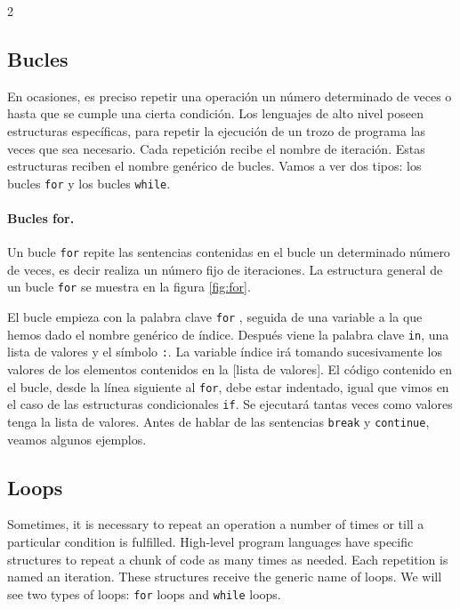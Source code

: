\begin{paracol}{2}
\subsection{Bucles}
En ocasiones, es preciso repetir una operación un número determinado de veces o hasta que se cumple una cierta condición. Los lenguajes de alto nivel poseen estructuras específicas, para repetir la ejecución de un trozo de programa las veces que sea necesario. Cada repetición recibe el nombre de iteración. Estas estructuras reciben el nombre genérico de bucles. Vamos a ver dos tipos: los bucles \texttt{for} y los bucles \texttt{while}.

\paragraph{Bucles for.} Un bucle \texttt{for} repite las sentencias contenidas en el bucle un determinado número de veces, es decir realiza un número fijo de iteraciones. La estructura general de un bucle \texttt{for} se muestra en la figura \ref{fig:for}.

El bucle empieza con la palabra clave \texttt{for} , seguida de una variable a la que hemos dado el nombre genérico de índice. Después viene la palabra clave \texttt{in}, una lista de valores y el símbolo \texttt{:}. La variable índice irá tomando sucesivamente los valores de los elementos contenidos en la [lista de valores]. El código contenido en el bucle, desde la línea siguiente al \texttt{for}, debe estar indentado, igual que vimos en el caso de las estructuras condicionales \texttt{if}.  Se ejecutará tantas veces como valores tenga la lista de valores. Antes de hablar de las sentencias \texttt{break} y \texttt{continue}, veamos algunos ejemplos.

\switchcolumn
\subsection{Loops}
Sometimes, it is necessary to repeat an operation a number of times or till a particular condition is fulfilled. High-level program languages have specific structures to repeat a chunk of code as many times as needed. Each repetition is named an iteration. These structures receive the generic name of loops. We will see two types of loops: \texttt{for} loops and \texttt{while} loops.


\end{paracol}
